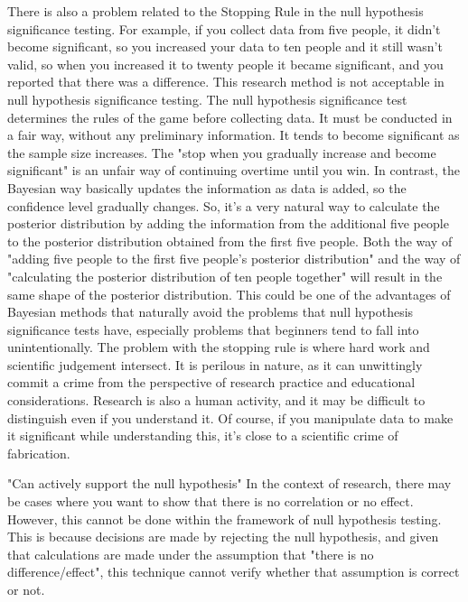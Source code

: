 \documentclass{ltjbook}
\begin{document}
There is also a problem related to the Stopping Rule in the null hypothesis significance testing. For example, if you collect data from five people, it didn't become significant, so you increased your data to ten people and it still wasn't valid, so when you increased it to twenty people it became significant, and you reported that there was a difference. This research method is not acceptable in null hypothesis significance testing. The null hypothesis significance test determines the rules of the game before collecting data. It must be conducted in a fair way, without any preliminary information. It tends to become significant as the sample size increases. The "stop when you gradually increase and become significant" is an unfair way of continuing overtime until you win. In contrast, the Bayesian way basically updates the information as data is added, so the confidence level gradually changes. So, it's a very natural way to calculate the posterior distribution by adding the information from the additional five people to the posterior distribution obtained from the first five people. Both the way of "adding five people to the first five people's posterior distribution" and the way of "calculating the posterior distribution of ten people together" will result in the same shape of the posterior distribution. This could be one of the advantages of Bayesian methods that naturally avoid the problems that null hypothesis significance tests have, especially problems that beginners tend to fall into unintentionally. The problem with the stopping rule is where hard work and scientific judgement intersect. It is perilous in nature, as it can unwittingly commit a crime from the perspective of research practice and educational considerations. Research is also a human activity, and it may be difficult to distinguish even if you understand it. Of course, if you manipulate data to make it significant while understanding this, it's close to a scientific crime of fabrication.

"Can actively support the null hypothesis"
In the context of research, there may be cases where you want to show that there is no correlation or no effect. However, this cannot be done within the framework of null hypothesis testing. This is because decisions are made by rejecting the null hypothesis, and given that calculations are made under the assumption that "there is no difference/effect", this technique cannot verify whether that assumption is correct or not.
\end{document}
